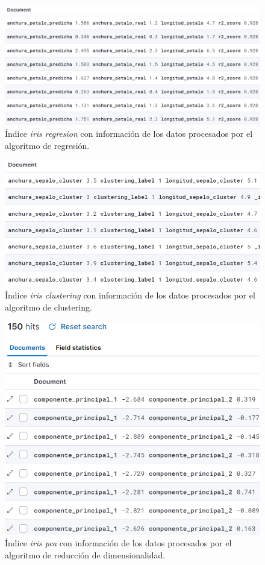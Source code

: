 \begin{figure}
    \centering
    \includegraphics[width=1\linewidth]{img/iris15.png}
    \caption{Índice \textit{iris regresion} con información de los datos procesados por el algoritmo de regresión.}
    \label{fig:index3}
\end{figure}


\begin{figure}
    \centering
    \includegraphics[width=1\linewidth]{img/iris16.png}
    \caption{Índice \textit{iris clustering} con información de los datos procesados por el algoritmo de clustering.}
    \label{fig:index4}
\end{figure}



\begin{figure}
    \centering
    \includegraphics[width=1\linewidth]{img/iris17.png}
    \caption{Índice \textit{iris pca} con información de los datos procesados por el algoritmo de reducción de dimensionalidad.}
    \label{fig:index5}
\end{figure}










